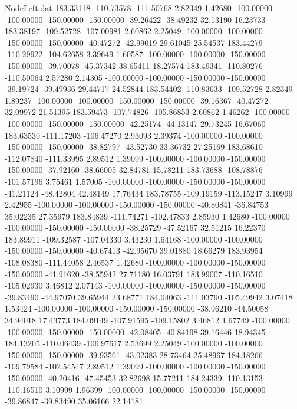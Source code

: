\begin{filecontents}{NodeLeft.dat}
 183.33118 -110.73578 -111.50768     2.82349    1.42680 -100.00000 -100.00000 -150.00000 -150.00000  -39.26422  -38.49232   32.13190   16.23733
 183.38197 -109.52728 -107.00981     2.60862    2.25049 -100.00000 -100.00000 -150.00000 -150.00000  -40.47272  -42.99019   29.61045   25.54537
 183.44279 -110.29922 -104.62658     3.39649    1.60587 -100.00000 -100.00000 -150.00000 -150.00000  -39.70078  -45.37342   38.65411   18.27574
 183.49341 -110.80276 -110.50064     2.57280    2.14305 -100.00000 -100.00000 -150.00000 -150.00000  -39.19724  -39.49936   29.44717   24.52844
 183.54402 -110.83633 -109.52728     2.82349    1.89237 -100.00000 -100.00000 -150.00000 -150.00000  -39.16367  -40.47272   32.09972   21.51395
 183.59473 -107.74826 -105.86853     2.60862    1.46262 -100.00000 -100.00000 -150.00000 -150.00000  -42.25174  -44.13147   29.73245   16.67060
 183.63539 -111.17203 -106.47270     2.93093    2.39374 -100.00000 -100.00000 -150.00000 -150.00000  -38.82797  -43.52730   33.36732   27.25169
 183.68610 -112.07840 -111.33995     2.89512    1.39099 -100.00000 -100.00000 -150.00000 -150.00000  -37.92160  -38.66005   32.84781   15.78211
 183.73688 -108.78876 -101.57196     3.75461    1.57005 -100.00000 -100.00000 -150.00000 -150.00000  -41.21124  -48.42804   42.48149   17.76434
 183.78755 -109.19159 -113.15247     3.10999    2.42955 -100.00000 -100.00000 -150.00000 -150.00000  -40.80841  -36.84753   35.02235   27.35979
 183.84839 -111.74271 -102.47833     2.85930    1.42680 -100.00000 -100.00000 -150.00000 -150.00000  -38.25729  -47.52167   32.51215   16.22370
 183.89911 -109.32587 -107.04330     3.43230    1.64168 -100.00000 -100.00000 -150.00000 -150.00000  -40.67413  -42.95670   39.01880   18.66279
 183.93954 -108.08380 -111.44058     2.46537    1.42680 -100.00000 -100.00000 -150.00000 -150.00000  -41.91620  -38.55942   27.71180   16.03791
 183.99007 -110.16510 -105.02930     3.46812    2.07143 -100.00000 -100.00000 -150.00000 -150.00000  -39.83490  -44.97070   39.65944   23.68771
 184.04063 -111.03790 -105.49942     3.07418    1.53424 -100.00000 -100.00000 -150.00000 -150.00000  -38.96210  -44.50058   34.94018   17.43773
 184.09149 -107.91595 -109.15802     3.46812    1.67749 -100.00000 -100.00000 -150.00000 -150.00000  -42.08405  -40.84198   39.16446   18.94345
 184.13205 -110.06439 -106.97617     2.53699    2.25049 -100.00000 -100.00000 -150.00000 -150.00000  -39.93561  -43.02383   28.73464   25.48967
 184.18266 -109.79584 -102.54547     2.89512    1.39099 -100.00000 -100.00000 -150.00000 -150.00000  -40.20416  -47.45453   32.82698   15.77211
 184.24339 -110.13153 -110.16510     3.10999    1.96399 -100.00000 -100.00000 -150.00000 -150.00000  -39.86847  -39.83490   35.06166   22.14181

\end{filecontents}
